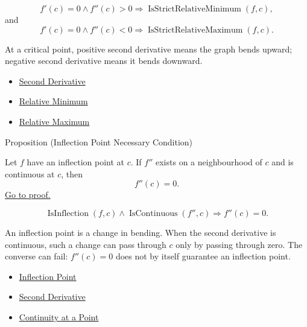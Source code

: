 \begin{remark*}
\[
  f'(c)=0\land f''(c)>0 \Rightarrow \operatorname{IsStrictRelativeMinimum}(f,c),
\]
and
\[
  f'(c)=0\land f''(c)<0 \Rightarrow \operatorname{IsStrictRelativeMaximum}(f,c).
\]
\end{remark*}

\begin{remark*}[Interpretation]
At a critical point, positive second derivative means the graph bends upward; negative second derivative means it bends downward.
\end{remark*}

\begin{dependencies}
\begin{itemize}
  \item \hyperref[def:second-derivative]{Second Derivative}
  \item \hyperref[def:relative-minimum]{Relative Minimum}
  \item \hyperref[def:relative-maximum]{Relative Maximum}
\end{itemize}
\end{dependencies}

\begin{propositionbox}{Proposition (Inflection Point Necessary Condition)}
\begin{proposition}
\label{prop:inflection-point-necessary-condition}
Let $f$ have an inflection point at $c$. If $f''$ exists on a neighbourhood of $c$ and is continuous at $c$, then
\[
  f''(c)=0.
\]
\hyperref[prf:inflection-point-necessary-condition]{Go to proof.}
\end{proposition}
\end{propositionbox}

\begin{remark*}
\[
  \operatorname{IsInflection}(f,c)\land \operatorname{IsContinuous}(f'',c)
  \Longrightarrow
  f''(c)=0.
\]
\end{remark*}

\begin{remark*}[Interpretation]
An inflection point is a change in bending. When the second derivative is continuous, such a change can pass through $c$ only by passing through zero. The converse can fail: $f''(c)=0$ does not by itself guarantee an inflection point.
\end{remark*}

\begin{dependencies}
\begin{itemize}
  \item \hyperref[def:inflection-point]{Inflection Point}
  \item \hyperref[def:second-derivative]{Second Derivative}
  \item \hyperref[def:continuous-at-point]{Continuity at a Point}
\end{itemize}
\end{dependencies}
